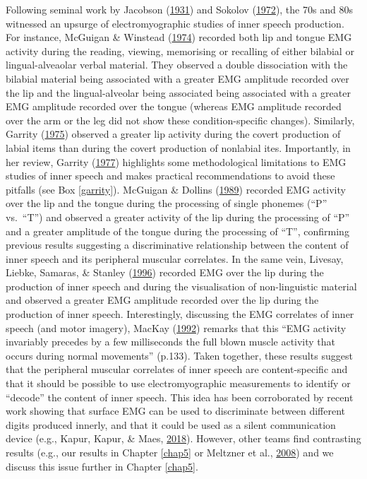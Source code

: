 \documentclass[a4paper,12pt,twoside,openright,oldfontcommands,final]{memoir}
\begin{document}
Following seminal work by Jacobson (\protect\hyperlink{ref-jacobson_electrical_1931}{1931}) and Sokolov (\protect\hyperlink{ref-sokolov_inner_1972}{1972}), the 70s and 80s witnessed an upsurge of electromyographic studies of inner speech production. For instance, McGuigan \& Winstead (\protect\hyperlink{ref-mcguigan_discriminative_1974}{1974}) recorded both lip and tongue EMG activity during the reading, viewing, memorising or recalling of either bilabial or lingual-alveaolar verbal material. They observed a double dissociation with the bilabial material being associated with a greater EMG amplitude recorded over the lip and the lingual-alveolar being associated being associated with a greater EMG amplitude recorded over the tongue (whereas EMG amplitude recorded over the arm or the leg did not show these condition-specific changes). Similarly, Garrity (\protect\hyperlink{ref-garrity_measurement_1975}{1975}) observed a greater lip activity during the covert production of labial items than during the covert production of nonlabial ites. Importantly, in her review, Garrity (\protect\hyperlink{ref-garrity_electromyography_1977}{1977}) highlights some methodological limitations to EMG studies of inner speech and makes practical recommendations to avoid these pitfalls (see Box \ref{garrity}). McGuigan \& Dollins (\protect\hyperlink{ref-mcguigan_patterns_1989}{1989}) recorded EMG activity over the lip and the tongue during the processing of single phonemes (\enquote{P} vs.~\enquote{T}) and observed a greater activity of the lip during the processing of \enquote{P} and a greater amplitude of the tongue during the processing of \enquote{T}, confirming previous results suggesting a discriminative relationship between the content of inner speech and its peripheral muscular correlates. In the same vein, Livesay, Liebke, Samaras, \& Stanley (\protect\hyperlink{ref-livesay_covert_1996}{1996}) recorded EMG over the lip during the production of inner speech and during the visualisation of non-linguistic material and observed a greater EMG amplitude recorded over the lip during the production of inner speech. Interestingly, discussing the EMG correlates of inner speech (and motor imagery), MacKay (\protect\hyperlink{ref-mackay_constraints_1992}{1992}) remarks that this \enquote{EMG activity invariably precedes by a few milliseconds the full blown muscle activity that occurs during normal movements} (p.133). Taken together, these results suggest that the peripheral muscular correlates of inner speech are content-specific and that it should be possible to use electromyographic measurements to identify or \enquote{decode} the content of inner speech. This idea has been corroborated by recent work showing that surface EMG can be used to discriminate between different digits produced innerly, and that it could be used as a silent communication device (e.g., Kapur, Kapur, \& Maes, \protect\hyperlink{ref-kapur_alterego_2018}{2018}). However, other teams find contrasting results (e.g., our results in Chapter \ref{chap5} or Meltzner et al., \protect\hyperlink{ref-meltzner_speech_2008}{2008}) and we discuss this issue further in Chapter \ref{chap5}.
\end{document}
